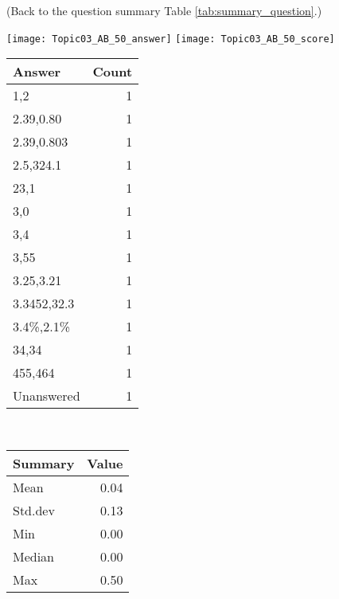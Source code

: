 \documentclass[12pt,english,nohyper]{tufte-handout}\usepackage[]{graphicx}\usepackage[]{color}
\begin{document}
 (Back to the question summary Table \ref{tab:summary_question}.)

\begin{center} \texttt{[image: Topic03\_AB\_50\_answer]} \texttt{[image: Topic03\_AB\_50\_score]} \end{center} 

\begin{center}%
\begin{tabular}{lr}
  \hline
Answer & Count \\ 
  \hline
1,2 &   1 \\ 
  2.39,0.80 &   1 \\ 
  2.39,0.803 &   1 \\ 
  2.5,324.1 &   1 \\ 
  23,1 &   1 \\ 
  3,0 &   1 \\ 
  3,4 &   1 \\ 
  3,55 &   1 \\ 
  3.25,3.21 &   1 \\ 
  3.3452,32.3 &   1 \\ 
  3.4\%,2.1\% &   1 \\ 
  34,34 &   1 \\ 
  455,464 &   1 \\ 
  Unanswered &   1 \\ 
   \hline
\end{tabular}
~~~~~~~~%
\begin{tabular}{lr}
  \hline
Summary & Value \\ 
  \hline
Mean & 0.04 \\ 
  Std.dev & 0.13 \\ 
  Min & 0.00 \\ 
  Median & 0.00 \\ 
  Max & 0.50 \\ 
   \hline
\end{tabular}
\end{center}\newpage{}
\end{document}
